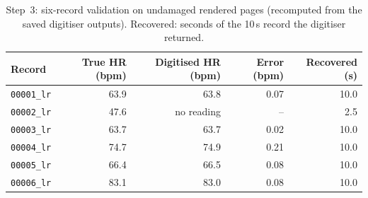 \begin{table}[ht]
\centering\small
\caption{Step~3: six-record validation on undamaged rendered pages (recomputed from the saved digitiser outputs). Recovered: seconds of the 10\,s record the digitiser returned.}\label{tab:step3}
\begin{tabular}{@{}lrrrr@{}}
\toprule
Record & True HR (bpm) & Digitised HR (bpm) & Error (bpm) & Recovered (s) \\
\midrule
\texttt{00001\_lr} & 63.9 & 63.8 & 0.07 & 10.0 \\
\texttt{00002\_lr} & 47.6 & no reading & -- & 2.5 \\
\texttt{00003\_lr} & 63.7 & 63.7 & 0.02 & 10.0 \\
\texttt{00004\_lr} & 74.7 & 74.9 & 0.21 & 10.0 \\
\texttt{00005\_lr} & 66.4 & 66.5 & 0.08 & 10.0 \\
\texttt{00006\_lr} & 83.1 & 83.0 & 0.08 & 10.0 \\
\bottomrule
\end{tabular}
\end{table}